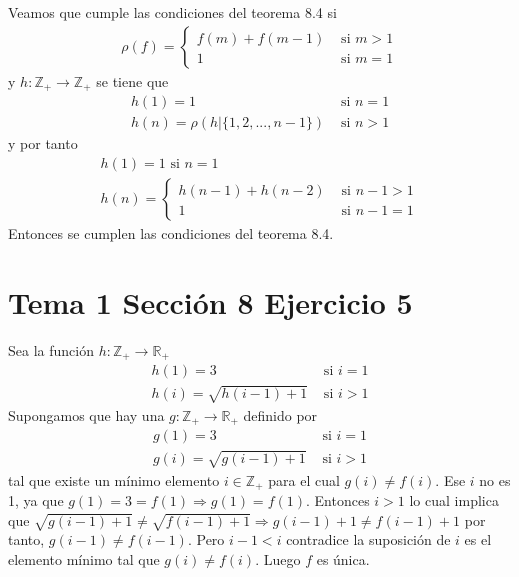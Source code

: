 \documentclass{article}
\begin{document}
Veamos que cumple las condiciones del teorema 8.4 si \begin{eqnarray}
\rho(f)=
\begin{cases}
f(m)+f(m-1) & \text{ si }m>1\nonumber\\
1 & \text{ si }m=1\nonumber
\end{cases}
\end{eqnarray}
 y $h:\mathbb{Z}_{+}\rightarrow \mathbb{Z}_{+}$ se tiene que 
\begin{eqnarray}
h(1)=1 & \text{ si }n=1\nonumber\\
h(n)=\rho(h|\{1,2,...,n-1\}) &
\text{ si }n>1 \nonumber
\end{eqnarray}
y por tanto
\begin{eqnarray}
&h(1)=1 \text{ si }n=1& \nonumber\\
&h(n)=\begin{cases}
h(n-1)+h(n-2) & \text{ si }n-1>1\nonumber\\
1 & \text{ si }n-1=1\nonumber
\end{cases}
\end{eqnarray}
Entonces se cumplen las condiciones del teorema 8.4.
\section{Tema 1 Sección 8 Ejercicio 5}
Sea la función $h:\mathbb{Z}_{+}\rightarrow \mathbb{R}_{+}$
\begin{eqnarray}
h(1)=3 & \text{ si }i=1\nonumber\\
h(i)=\sqrt{h(i-1)+1} &
\text{ si }i>1 \nonumber
\end{eqnarray}
Supongamos que hay una $g:\mathbb{Z}_{+}\rightarrow \mathbb{R}_{+}$ definido por
\begin{eqnarray}
g(1)=3 & \text{ si }i=1\nonumber\\
g(i)=\sqrt{g(i-1)+1} &
\text{ si }i>1 \nonumber
\end{eqnarray}
tal que existe un mínimo elemento $i\in \mathbb{Z}_{+}$ para el cual $g(i)\neq f(i)$. Ese $i$ no es 1, ya que $g(1)=3=f(1)\Rightarrow g(1)=f(1)$. Entonces $i>1$ lo cual implica que $\sqrt{g(i-1)+1}\neq \sqrt{f(i-1)+1} \Rightarrow  g(i-1)+1\neq f(i-1)+1$ por tanto, $g(i-1)\neq f(i-1)$. Pero $i-1<i$ contradice la suposición de $i$ es el elemento mínimo tal que $g(i)\neq f(i)$. Luego $f$ es única.
\end{document}
